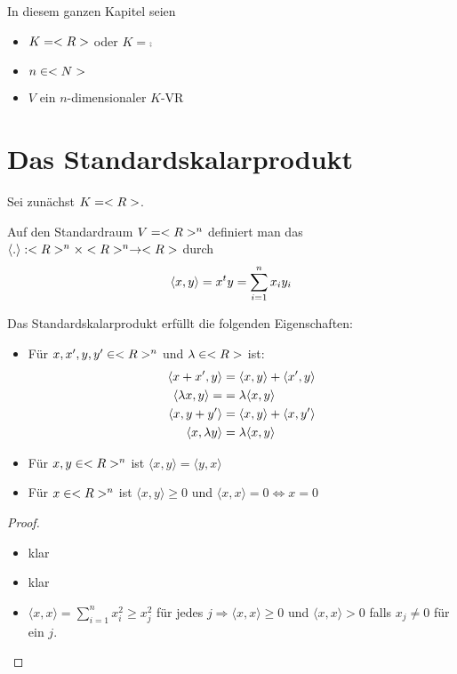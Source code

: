 In diesem ganzen Kapitel seien
\begin{itemize}
	\item $K=<R>$ oder $K=\comp$
	\item $n\in<N>$
	\item $V$ ein $n$-dimensionaler $K$-VR
\end{itemize}

\section{Das Standardskalarprodukt}

Sei zunächst $K=<R>$.

\begin{definition}
	Auf den Standardraum $V=<R>^n$ definiert man das  $\langle.\rangle:<R>^n\times<R>^n\to <R>$ durch
	\begin{align}
		\langle x,y\rangle=x^ty=\sum_{i=1}^n x_iy_i\notag
	\end{align}
\end{definition}

\begin{proposition}
	Das Standardskalarprodukt erfüllt die folgenden Eigenschaften:
	\begin{itemize}
		\item Für $x,x',y,y'\in<R>^n$ und $\lambda\in<R>$ ist:
		\begin{align}
			\langle x+x',y\rangle &= \langle x,y\rangle + \langle x',y\rangle\notag\\
			\langle \lambda x,y\rangle =&= \lambda \langle x,y \rangle\notag \\
			\langle x,y+y' \rangle &= \langle x,y \rangle + \langle x,y'\rangle\notag \\
			\langle x,\lambda y \rangle &= \lambda \langle x,y \rangle\notag
		\end{align}
		\item Für $x,y\in<R>^n$ ist $\langle x,y \rangle=\langle y,x\rangle$
		\item Für $x\in<R>^n$ ist $\langle x,y \rangle\ge 0$ und $\langle x,x\rangle=0\iff x=0$
	\end{itemize}
\end{proposition}
\begin{proof}
	\begin{itemize}
		\item klar
		\item klar
		\item $\langle x,x\rangle=\sum_{i=1}^n x_i^2\ge x_j^2$ für jedes $j\Rightarrow \langle x,x\rangle\ge 0$ und $\langle x,x \rangle>0$ falls $x_j\neq 0$ für ein $j$.
	\end{itemize}
\end{proof}

